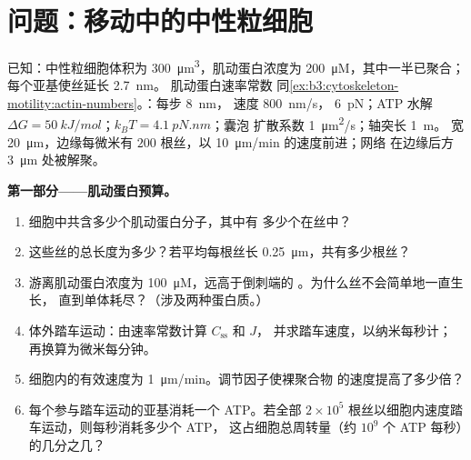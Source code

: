 \section{问题：移动中的中性粒细胞}

\begin{problem}
\label{pb:b3:cytoskeleton-motility:1}
已知：中性粒细胞体积为 \qty{300}{\micro m^3}，肌动蛋白浓度为
\qty{200}{\micro M}，其中一半已聚合；每个亚基使丝延长 \qty{2.7}{nm}。
肌动蛋白速率常数
同\cref{ex:b3:cytoskeleton-motility:actin-numbers}。：每步 \qty{8}{nm}，
速度 \qty{800}{nm/s}， \qty{6}{pN}；ATP 水解
$\Delta G = \qty{50}{kJ/mol}$；$k_{B}T = \qty{4.1}{pN.nm}$；囊泡
扩散系数 \qty{1}{\micro m^2/s}；轴突长 \qty{1}{m}。
宽 \qty{20}{\micro m}，边缘每微米有
$200$ 根丝，以 \qty{10}{\micro m/min} 的速度前进；网络
在边缘后方 \qty{3}{\micro m} 处被解聚。

\medskip
\noindent\textbf{第一部分——肌动蛋白预算。}
\begin{enumerate}
  \item 细胞中共含多少个肌动蛋白分子，其中有
        多少个在丝中？
  \item 这些丝的总长度为多少？若平均每根丝长
        \qty{0.25}{\micro m}，共有多少根丝？
  \item 游离肌动蛋白浓度为 \qty{100}{\micro M}，远高于倒刺端的
        。为什么丝不会简单地一直生长，
        直到单体耗尽？（涉及两种蛋白质。）
  \item 体外踏车运动：由速率常数计算 $C_{\text{ss}}$ 和 $J$，
        并求踏车速度，以纳米每秒计；
        再换算为微米每分钟。
  \item 细胞内的有效速度为 \qty{1}{\micro m/min}。调节因子使裸聚合物
        的速度提高了多少倍？
  \item 每个参与踏车运动的亚基消耗一个 ATP。若全部 $2\times 10^{5}$
        根丝以细胞内速度踏车运动，则每秒消耗多少个 ATP，
        这占细胞总周转量（约
        $10^{9}$ 个 ATP 每秒）的几分之几？
\end{enumerate}


\end{problem}
